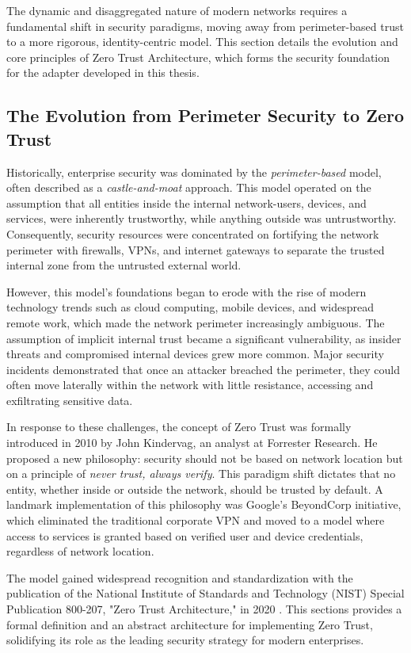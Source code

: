 \documentclass[12pt, a4paper, reqno, oneside]{book}
\begin{document}
The dynamic and disaggregated nature of modern networks requires a fundamental shift in security paradigms, moving away from perimeter-based trust to a more rigorous, identity-centric model. This section details the evolution and core principles of Zero Trust Architecture, which forms the security foundation for the adapter developed in this thesis.

\subsection{The Evolution from Perimeter Security to Zero Trust}
Historically, enterprise security was dominated by the \textit{perimeter-based} model, often described as a \textit{castle-and-moat} approach. This model operated on the assumption that all entities inside the internal network-users, devices, and services, were inherently trustworthy, while anything outside was untrustworthy. Consequently, security resources were concentrated on fortifying the network perimeter with firewalls, VPNs, and internet gateways to separate the trusted internal zone from the untrusted external world.



However, this model's foundations began to erode with the rise of modern technology trends such as cloud computing, mobile devices, and widespread remote work, which made the network perimeter increasingly ambiguous. The assumption of implicit internal trust became a significant vulnerability, as insider threats and compromised internal devices grew more common. \cite{mo_perimeter_problem} Major security incidents demonstrated that once an attacker breached the perimeter, they could often move laterally within the network with little resistance, accessing and exfiltrating sensitive data.
 
In response to these challenges, the concept of Zero Trust was formally introduced in 2010 by John Kindervag, an analyst at Forrester Research.\cite{kindervag_2010} He proposed a new philosophy: security should not be based on network location but on a principle of \textit{never trust, always verify}. This paradigm shift dictates that no entity, whether inside or outside the network, should be trusted by default. A landmark implementation of this philosophy was Google's BeyondCorp initiative, which eliminated the traditional corporate VPN and moved to a model where access to services is granted based on verified user and device credentials, regardless of network location.

The model gained widespread recognition and standardization with the publication of the National Institute of Standards and Technology (NIST) Special Publication 800-207, "Zero Trust Architecture," in 2020 \cite{rose_zero_2020}. This sections provides a formal definition and an abstract architecture for implementing Zero Trust, solidifying its role as the leading security strategy for modern enterprises.
\end{document}
